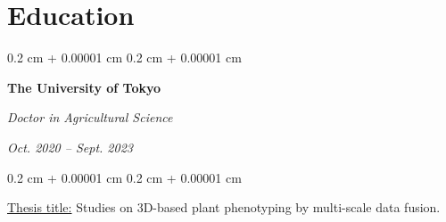 \documentclass[10pt, a4paper]{article}
\newenvironment{highlights}{
    \begin{itemize}[
        topsep=0.10 cm,
        parsep=0.10 cm,
        partopsep=0pt,
        itemsep=0pt,
        leftmargin=0.4 cm + 10pt
    ]
}{
    \end{itemize}
} %
\newenvironment{onecolentry}{
    \begin{adjustwidth}{
        0.2 cm + 0.00001 cm
    }{
        0.2 cm + 0.00001 cm
    }
}{
    \end{adjustwidth}
} %
\newenvironment{twocolentry}[2][]{
    \onecolentry
    \def\secondColumn{#2}
    \setcolumnwidth{\fill, 4.5 cm}
    \begin{paracol}{2}
}{
    \switchcolumn \raggedleft \secondColumn
    \end{paracol}
    \endonecolentry
} %
\let\hrefWithoutArrow\href
\renewcommand{\href}[2]{\hrefWithoutArrow{#1}{\ifthenelse{\equal{#2}{}}{ }{#2 }\raisebox{.15ex}{\footnotesize \faExternalLink*}}}
\begin{document}

            
            


    \section{Education}
        
        \begin{twocolentry}{
            \textit{Oct. 2020 – Sept. 2023}}
            \textbf{The University of Tokyo}

            \textit{Doctor in Agricultural Science}
        \end{twocolentry}

        \vspace{0.10 cm}
        \begin{onecolentry}
            \underline{Thesis title:} Studies on 3D-based plant phenotyping by multi-scale data fusion.
        \end{onecolentry}
\end{document}
